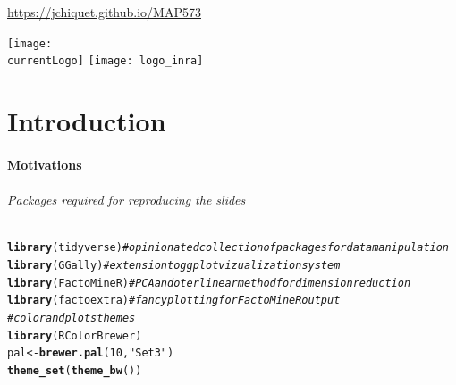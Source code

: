 \documentclass{beamer}\usepackage[]{graphicx}\usepackage[]{color}
\title{\currentCourse}
\subtitle{\huge\currentChapter\normalsize}
\institute{\currentInstitute}
\date{\currentDate}
\makeatletter
\newcommand{\hlnum}[1]{\textcolor[rgb]{0.686,0.059,0.569}{#1}}%
\newcommand{\hlstr}[1]{\textcolor[rgb]{0.192,0.494,0.8}{#1}}%
\newcommand{\hlcom}[1]{\textcolor[rgb]{0.678,0.584,0.686}{\textit{#1}}}%
\newcommand{\hlstd}[1]{\textcolor[rgb]{0.345,0.345,0.345}{#1}}%
\newcommand{\hlkwb}[1]{\textcolor[rgb]{0.69,0.353,0.396}{#1}}%
\newcommand{\hlkwd}[1]{\textcolor[rgb]{0.737,0.353,0.396}{\textbf{#1}}}%
\newenvironment{kframe}{%
 \def\at@end@of@kframe{}%
 \ifinner\ifhmode%
  \def\at@end@of@kframe{\end{minipage}}%
  \begin{minipage}{\columnwidth}%
 \fi\fi%
 \def\FrameCommand##1{\hskip\@totalleftmargin \hskip-\fboxsep
 \colorbox{shadecolor}{##1}\hskip-\fboxsep
     \hskip-\linewidth \hskip-\@totalleftmargin \hskip\columnwidth}%
 \MakeFramed {\advance\hsize-\width
   \@totalleftmargin\z@ \linewidth\hsize
   \@setminipage}}%
 {\par\unskip\endMakeFramed%
 \at@end@of@kframe}
\newenvironment{knitrout}{}{} %
\def\currentLogo{../common_figs/logo_X}
\newcommand{\dotitlepage}{%
  \begin{frame}
    \titlepage
    \vfill
    \begin{center}
        \scriptsize\url{https://jchiquet.github.io/MAP573}
    \end{center}
    \vfill
    \texttt{[image: \\currentLogo]}\hfill
    \texttt{[image: logo\_inra]}
  \end{frame}
}
\makeatother
\begin{document}
\dotitlepage

\part{Introduction}

\subsection{Motivations}

\begin{frame}[fragile]
  \partpage

\paragraph{Packages required for reproducing the slides}
\begin{knitrout}\scriptsize
{}\color{fgcolor}\begin{kframe}
\begin{alltt}
\hlkwd{library}\hlstd{(tidyverse)}  \hlcom{# opinionated collection of packages for data manipulation}
\hlkwd{library}\hlstd{(GGally)}     \hlcom{# extension to ggplot vizualization system}
\hlkwd{library}\hlstd{(FactoMineR)} \hlcom{# PCA and oter linear method for dimension reduction}
\hlkwd{library}\hlstd{(factoextra)} \hlcom{# fancy plotting for FactoMineR output}
\hlcom{# color and plots themes}
\hlkwd{library}\hlstd{(RColorBrewer)}
\hlstd{pal} \hlkwb{<-} \hlkwd{brewer.pal}\hlstd{(}\hlnum{10}\hlstd{,} \hlstr{"Set3"}\hlstd{)}
\hlkwd{theme_set}\hlstd{(}\hlkwd{theme_bw}\hlstd{())}
\end{alltt}
\end{kframe}
\end{knitrout}

\end{frame}
\end{document}
